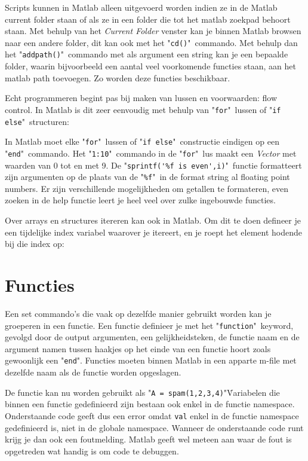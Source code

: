 \documentclass[11pt,twoside]{article}
\begin{document}
Scripts kunnen in Matlab alleen uitgevoerd worden indien ze in de Matlab current folder staan of als ze in een folder die tot het matlab zoekpad behoort staan. Met behulp van het \emph{Current Folder} venster kan je binnen Matlab browsen naar een andere folder, dit kan ook met het "\lstinline{cd()}"\ commando. Met behulp dan het "\lstinline{addpath()}"\ commando met als argument een string kan je een bepaalde folder, waarin bijvoorbeeld een aantal veel voorkomende functies staan, aan het matlab path toevoegen. Zo worden deze functies beschikbaar.

Echt programmeren begint pas bij maken van lussen en voorwaarden: flow control. In Matlab is dit zeer eenvoudig met behulp van "\lstinline{for}"\ lussen of "\lstinline{if else}"\ structuren:


In Matlab moet elke "\lstinline{for}"\ lussen of "\lstinline{if else}"\ constructie eindigen op een "\lstinline{end}"\ commando.
Het "\lstinline{1:10}"\ commando in de "\lstinline{for}"\ lus maakt een \emph{Vector} met waarden van 0 tot en met 9. De "\lstinline{sprintf('%f is even',i)}"\ functie formatteert zijn argumenten op de plaats van de "\lstinline{%f}"\ in de format string al floating point numbers. Er zijn verschillende mogelijkheden om getallen te formateren, even zoeken in de help functie leert je heel veel over zulke ingebouwde functies.

Over arrays en structures itereren kan ook in Matlab. Om dit te doen defineer je een tijdelijke index variabel waarover je itereert, en je roept het element hodende bij die index op:


	\section{Functies}
Een set commando's die vaak op dezelfde manier gebruikt worden kan je groeperen in een functie. Een functie definieer je met het "\lstinline{function}"\ keyword, gevolgd door de output argumenten, een gelijkheidsteken, de functie naam en de argument namen tussen haakjes op het einde van een functie hoort zoals gewoonlijk een "\lstinline{end}". Functies moeten binnen Matlab in een apparte m-file met dezelfde naam als de functie worden opgeslagen.


De functie kan nu worden gebruikt als "\lstinline{A = spam(1,2,3,4)}"\. Variabelen die binnen een functie gedefinieerd zijn bestaan ook enkel in de functie namespace. Onderstaande code geeft dus een error omdat \lstinline{val} enkel in de functie namespace gedefinieerd is, niet in de globale namespace. Wanneer de onderstaande code runt krijg je dan ook een foutmelding. Matlab geeft wel meteen aan waar de fout is opgetreden wat handig is om code te debuggen.

\end{document}
